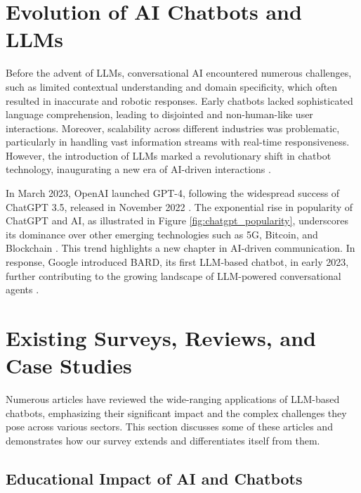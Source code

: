 \section{Evolution of AI Chatbots and LLMs}

Before the advent of LLMs, conversational AI encountered numerous challenges, such as limited contextual understanding and domain specificity, which often resulted in inaccurate and robotic responses. Early chatbots lacked sophisticated language comprehension, leading to disjointed and non-human-like user interactions. Moreover, scalability across different industries was problematic, particularly in handling vast information streams with real-time responsiveness. However, the introduction of LLMs marked a revolutionary shift in chatbot technology, inaugurating a new era of AI-driven interactions \cite{dam2024complete}.


In March 2023, OpenAI launched GPT-4, following the widespread success of ChatGPT 3.5, released in November 2022 \cite{bahrini2023chatgpt, zhang2023one}. The exponential rise in popularity of ChatGPT and AI, as illustrated in Figure \ref{fig:chatgpt_popularity}, underscores its dominance over other emerging technologies such as 5G, Bitcoin, and Blockchain \cite{tech_trends_2023}. This trend highlights a new chapter in AI-driven communication. In response, Google introduced BARD, its first LLM-based chatbot, in early 2023, further contributing to the growing landscape of LLM-powered conversational agents \cite{google_bard_2023}.

\section{Existing Surveys, Reviews, and Case Studies}

Numerous articles have reviewed the wide-ranging applications of LLM-based chatbots, emphasizing their significant impact and the complex challenges they pose across various sectors. This section discusses some of these articles and demonstrates how our survey extends and differentiates itself from them.

\subsection{Educational Impact of AI and Chatbots}

